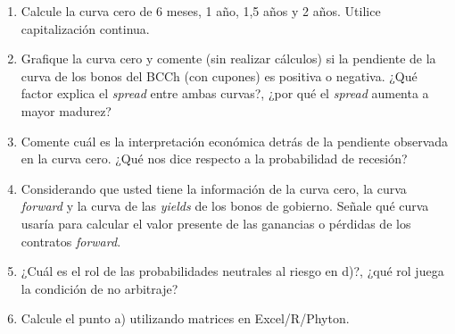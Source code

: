\documentclass[12pt]{article}
\begin{document}
\begin{enumerate}[label=\textbf{\alph*)}]
    \item Calcule la curva cero de 6 meses, 1 año, 1,5 años y 2 años.
     Utilice capitalización continua.
    
    \item Grafique la curva cero y comente (sin realizar cálculos) si 
    la pendiente de la curva de los bonos del BCCh (con cupones) es 
    positiva o negativa. ¿Qué factor explica el \textit{spread} entre 
    ambas curvas?, ¿por qué el \textit{spread} aumenta a mayor madurez?
    
    \item Comente cuál es la interpretación económica detrás de la 
    pendiente observada en la curva cero. ¿Qué nos dice respecto a 
    la probabilidad de recesión?
    
    \item Considerando que usted tiene la información de la curva cero, 
    la curva \textit{forward} y la curva de las \textit{yields} de los 
    bonos de gobierno. Señale qué curva usaría para calcular el valor 
    presente de las ganancias o pérdidas de los contratos \textit{forward}.
    
    \item ¿Cuál es el rol de las probabilidades neutrales al riesgo en d)?, 
    ¿qué rol juega la condición de no arbitraje?
    
    \item Calcule el punto a) utilizando matrices en Excel/R/Phyton.
\end{enumerate}
\end{document}
